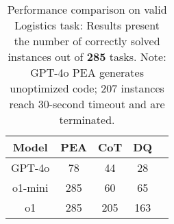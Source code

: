 

\begin{table}
\begin{center}
    \caption{Performance comparison on valid Logistics task: Results present the number of correctly solved instances out of \textbf{285} tasks. Note: GPT-4o PEA generates unoptimized code; $207$ instances reach $30$-second timeout and are terminated.}
    \begin{tabular}{ ccccc } 
        \toprule \bf Model & \bf PEA & \bf CoT & \bf DQ  \\
        \hline GPT-4o & 78 & 44 & 28  \\  
        \hline o1-mini & 285 & 60 &  65 \\  
        \hline o1 & 285 & 205 &  163  \\ 
        \bottomrule
    \end{tabular}
    \label{tab:logi}
\end{center}
\vspace{-0.3cm}
\end{table}


